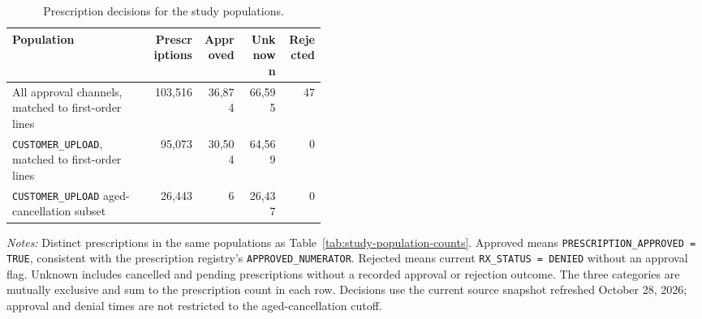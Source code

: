 \begin{table}[htbp]
\centering
\caption{Prescription decisions for the study populations.}
\label{tab:study-population-prescription-decisions}
\small
\begin{tabular}{@{}>{\raggedright\arraybackslash}p{0.45\linewidth}rrrr@{}}
\toprule
Population & Prescriptions & Approved & Unknown & Rejected \\
\midrule
All approval channels, matched to first-order lines & 103,516 & 36,874 & 66,595 & 47 \\
\texttt{CUSTOMER\_UPLOAD}, matched to first-order lines & 95,073 & 30,504 & 64,569 & 0 \\
\texttt{CUSTOMER\_UPLOAD} aged-cancellation subset & 26,443 & 6 & 26,437 & 0 \\
\bottomrule
\end{tabular}

\begin{minipage}{\linewidth}
\footnotesize
\textit{Notes:} Distinct prescriptions in the same populations as
Table~\ref{tab:study-population-counts}. Approved means
\texttt{PRESCRIPTION\_APPROVED = TRUE}, consistent with the prescription registry's
\texttt{APPROVED\_NUMERATOR}. Rejected means current \texttt{RX\_STATUS = DENIED}
without an approval flag. Unknown includes cancelled and pending prescriptions
without a recorded approval or rejection outcome. The three categories are
mutually exclusive and sum to the prescription count in each row.
Decisions use the current source snapshot refreshed October 28, 2026;
approval and denial times are not restricted to the aged-cancellation cutoff.
\end{minipage}
\end{table}

